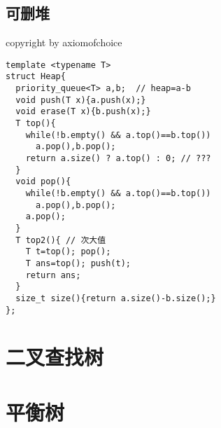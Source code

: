 \documentclass[12pt]{article}
\begin{document}
{{{{{{{{{{{{{{{\subsection{可删堆}
copyright by axiomofchoice
{\setmainfont{Consolas}
\begin{lstlisting}
template <typename T>
struct Heap{
  priority_queue<T> a,b;  // heap=a-b
  void push(T x){a.push(x);}
  void erase(T x){b.push(x);}
  T top(){
    while(!b.empty() && a.top()==b.top())
      a.pop(),b.pop();
    return a.size() ? a.top() : 0; // ???
  }
  void pop(){
    while(!b.empty() && a.top()==b.top())
      a.pop(),b.pop();
    a.pop();
  }
  T top2(){ // 次大值
    T t=top(); pop();
    T ans=top(); push(t);
    return ans;
  }
  size_t size(){return a.size()-b.size();}
};
\end{lstlisting}

\section{ 二叉查找树}
\section{ 平衡树}
}}}}}}}}}}}}}}}}
\end{document}

